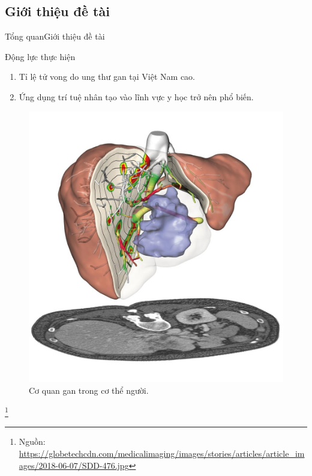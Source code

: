 \documentclass[
	10pt,                %
	aspectratio=169,     %
]{beamer}
\newcommand\footnotesource[1]{					%
	\vspace{-10mm}\let\thefootnote\relax\footnote{\hspace{-3mm}\tiny Nguồn:~#1}
}
\begin{document}
\subsection{Giới thiệu đề tài}
	\begin{frame}{Tổng quan}{Giới thiệu đề tài}
	    \begin{block}{Động lực thực hiện}
			\begin{enumerate}
				\item Tỉ lệ tử vong do ung thư gan tại Việt Nam cao.
				\item Ứng dụng trí tuệ nhân tạo vào lĩnh vực y học trở nên phổ biến.
			\end{enumerate}
		\end{block}
		\vspace{-0.2cm}
		\begin{figure}[h!]
			\includegraphics[scale=0.1]{Presentation_template/figures/medical_CT.jpg}
			\caption{Cơ quan gan trong cơ thể người.}
		\end{figure}
		\footnotesource{ \url{https://globetechcdn.com/medicalimaging/images/stories/articles/article_images/2018-06-07/SDD-476.jpg}}
	\end{frame}
\end{document}
